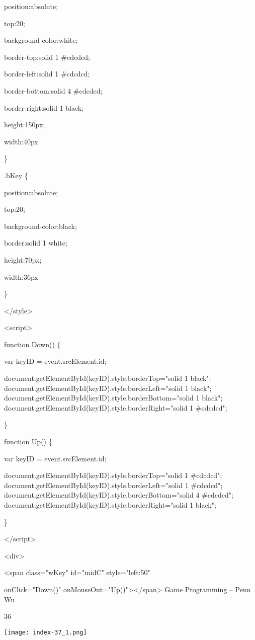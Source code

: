 \documentclass[
]{article}
\begin{document}
position:absolute;

top:20;

background-color:white;

border-top:solid 1 \#cdcdcd;

border-left:solid 1 \#cdcdcd;

border-bottom:solid 4 \#cdcdcd;

border-right:solid 1 black;

height:150px;

width:40px

\}

.bKey \{

position:absolute;

top:20;

background-color:black;

border:solid 1 white;

height:70px;

width:36px

\}

\textless/style\textgreater{}

\textless script\textgreater{}

function Down() \{

var keyID = event.srcElement.id;

document.getElementById(keyID).style.borderTop="solid 1 black";
document.getElementById(keyID).style.borderLeft="solid 1 black";
document.getElementById(keyID).style.borderBottom="solid 1 black";
document.getElementById(keyID).style.borderRight="solid 1 \#cdcdcd";

\}

function Up() \{

var keyID = event.srcElement.id;

document.getElementById(keyID).style.borderTop="solid 1 \#cdcdcd";
document.getElementById(keyID).style.borderLeft="solid 1 \#cdcdcd";
document.getElementById(keyID).style.borderBottom="solid 4 \#cdcdcd";
document.getElementById(keyID).style.borderRight="solid 1 black";

\}

\textless/script\textgreater{}

\textless div\textgreater{}

\textless span class="wKey" id="midC" style="left:50"

onClick="Down()"
onMouseOut="Up()"\textgreater\textless/span\textgreater{} Game
Programming -- Penn Wu

36

\protect\hypertarget{index_split_003.htmlux5cux23p37}{}{}\texttt{[image: index-37\_1.png]}
\end{document}
